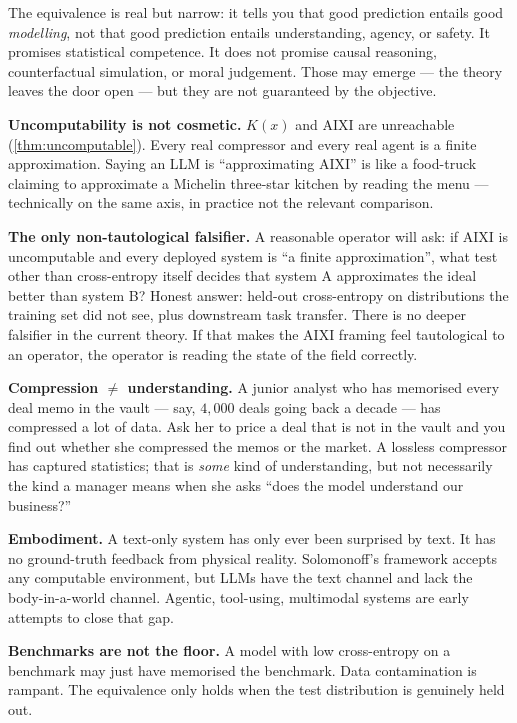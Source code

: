 \documentclass[12pt,a4paper]{article}
\theoremstyle{plain}
\theoremstyle{definition}
\begin{document}
\begin{intuition}
The equivalence is real but narrow: it tells you that good prediction
entails good \emph{modelling}, not that good prediction entails
understanding, agency, or safety.  It promises statistical competence.
It does not promise causal reasoning, counterfactual simulation, or
moral judgement.  Those may emerge --- the theory leaves the door
open --- but they are not guaranteed by the objective.

\textbf{Uncomputability is not cosmetic.}  $K(x)$ and AIXI are
unreachable (\cref{thm:uncomputable}).  Every real compressor and
every real agent is a finite approximation.  Saying an LLM is
``approximating AIXI'' is like a food-truck claiming to approximate
a Michelin three-star kitchen by reading the menu --- technically
on the same axis, in practice not the relevant comparison.

\textbf{The only non-tautological falsifier.}  A reasonable operator
will ask: if AIXI is uncomputable and every deployed system is ``a
finite approximation'', what test other than cross-entropy itself
decides that system A approximates the ideal better than system B?
Honest answer: held-out cross-entropy on distributions the training
set did not see, plus downstream task transfer.  There is no deeper
falsifier in the current theory.  If that makes the AIXI framing
feel tautological to an operator, the operator is reading the state
of the field correctly.

\textbf{Compression $\ne$ understanding.}  A junior analyst who has
memorised every deal memo in the vault --- say, $4{,}000$ deals
going back a decade --- has compressed a lot of data.  Ask her to
price a deal that is not in the vault and you find out whether she
compressed the memos or the market.  A lossless compressor has
captured statistics; that is \emph{some} kind of understanding, but
not necessarily the kind a manager means when she asks ``does the
model understand our business?''

\textbf{Embodiment.}  A text-only system has only ever been surprised
by text.  It has no ground-truth feedback from physical reality.
Solomonoff's framework accepts any computable environment, but LLMs
have the text channel and lack the body-in-a-world channel.  Agentic,
tool-using, multimodal systems are early attempts to close that gap.

\textbf{Benchmarks are not the floor.}  A model with low cross-entropy
on a benchmark may just have memorised the benchmark.  Data
contamination is rampant.  The equivalence only holds when the test
distribution is genuinely held out.


\end{intuition}
\end{document}
